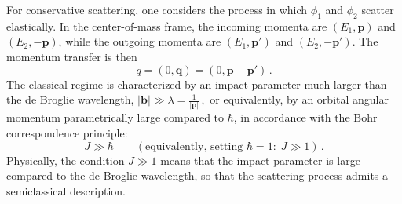 For conservative scattering, one considers the process in which $\phi_1$ and $\phi_2$ scatter elastically. In the center-of-mass frame, the incoming momenta are $(E_1,\boldsymbol{p})$ and $(E_2,-\boldsymbol{p})$, while the outgoing momenta are $(E_1,\boldsymbol{p}')$ and $(E_2,-\boldsymbol{p}')$. The momentum transfer is then
\begin{equation}
    q=(0,\boldsymbol{q})=(0,\boldsymbol{p}-\boldsymbol{p}')\, .
\end{equation}
The classical regime is characterized by an impact parameter much larger than the de Broglie wavelength, $ |\boldsymbol{b}| \gg \lambda = \frac{1}{|\boldsymbol{p}|}\,,$ or equivalently, by an orbital angular momentum parametrically large compared to $\hbar$, in accordance with the Bohr correspondence principle:
\begin{equation}
    J \gg \hbar \qquad (\text{equivalently, setting }\hbar=1:\; J\gg 1)\, .
\end{equation}
Physically, the condition $J\gg 1$ means that the impact parameter is large compared to the de Broglie wavelength, so that the scattering process admits a semiclassical description.

